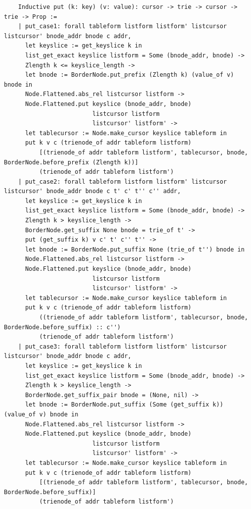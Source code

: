 \documentclass[runningheads]{llncs}
\begin{document}
\begin{verbatim}
    Inductive put (k: key) (v: value): cursor -> trie -> cursor -> trie -> Prop :=
    | put_case1: forall tableform listform listform' listcursor listcursor' bnode_addr bnode c addr,
      let keyslice := get_keyslice k in
      list_get_exact keyslice listform = Some (bnode_addr, bnode) ->
      Zlength k <= keyslice_length ->
      let bnode := BorderNode.put_prefix (Zlength k) (value_of v) bnode in
      Node.Flattened.abs_rel listcursor listform ->
      Node.Flattened.put keyslice (bnode_addr, bnode)
                         listcursor listform
                         listcursor' listform' ->
      let tablecursor := Node.make_cursor keyslice tableform in
      put k v c (trienode_of addr tableform listform)
          [(trienode_of addr tableform listform', tablecursor, bnode, BorderNode.before_prefix (Zlength k))]
          (trienode_of addr tableform listform')
    | put_case2: forall tableform listform listform' listcursor listcursor' bnode_addr bnode c t' c' t'' c'' addr,
      let keyslice := get_keyslice k in
      list_get_exact keyslice listform = Some (bnode_addr, bnode) ->
      Zlength k > keyslice_length ->
      BorderNode.get_suffix None bnode = trie_of t' ->
      put (get_suffix k) v c' t' c'' t'' ->
      let bnode := BorderNode.put_suffix None (trie_of t'') bnode in
      Node.Flattened.abs_rel listcursor listform ->
      Node.Flattened.put keyslice (bnode_addr, bnode)
                         listcursor listform
                         listcursor' listform' ->
      let tablecursor := Node.make_cursor keyslice tableform in
      put k v c (trienode_of addr tableform listform)
          ((trienode_of addr tableform listform', tablecursor, bnode, BorderNode.before_suffix) :: c'')
          (trienode_of addr tableform listform')
    | put_case3: forall tableform listform listform' listcursor listcursor' bnode_addr bnode c addr,
      let keyslice := get_keyslice k in
      list_get_exact keyslice listform = Some (bnode_addr, bnode) ->
      Zlength k > keyslice_length ->
      BorderNode.get_suffix_pair bnode = (None, nil) ->
      let bnode := BorderNode.put_suffix (Some (get_suffix k)) (value_of v) bnode in
      Node.Flattened.abs_rel listcursor listform ->
      Node.Flattened.put keyslice (bnode_addr, bnode)
                         listcursor listform
                         listcursor' listform' ->
      let tablecursor := Node.make_cursor keyslice tableform in
      put k v c (trienode_of addr tableform listform)
          [(trienode_of addr tableform listform', tablecursor, bnode, BorderNode.before_suffix)]
          (trienode_of addr tableform listform')

\end{verbatim}
\end{document}
